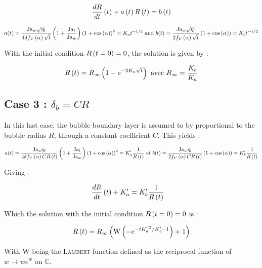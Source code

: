 \begin{align}
\frac{dR}{dt}\left( t \right)+a\left( t \right)R\left( t \right)=b\left( t \right)
\end{align}

\begin{align}
\label{eq:coeff_expgrowth}
a(t)=\frac{\mathrm{Ja}_{w}\sqrt{\eta_{l}}}{4\delta f_{V}\left( \alpha \right)\sqrt{t}}\left( 1+\frac{\mathrm{Ja}_{l}}{\mathrm{Ja}_{w}} \right)\left( 1+\mathrm{cos}\left( \alpha \right) \right)^{2}=K_{a}t^{-1/2} \text{ and } b(t)=\frac{\mathrm{Ja}_{w}\sqrt{\eta_{l}}}{2f_{V}\left( \alpha \right)\sqrt{t}}\left( 1+\mathrm{cos}\left( \alpha \right) \right)=K_ {b}t^{-1/2}
\end{align}

With the initial condition $R\left( t=0 \right)=0$, the solution is given by : 

\begin{align}
R\left( t \right)=R_{\infty}\left( 1-e^{-2K_{a}\sqrt{t}} \right) \text{ avec } R_{\infty}=\frac{K_{b}}{K_{a}}
\end{align}

\npar
\subsection{Case 3 : $\delta_{b}=CR$}
\npar

In this last case, the bubble boundary layer is assumed to by proportional to the bubble radius $R$, through a constant coefficient $C$. This yields :


\begin{align}
a(t)=\frac{\mathrm{Ja}_{w}\eta_{l}}{4\delta f_{V}\left( \alpha \right)CR\left( t \right)}\left( 1+\frac{\mathrm{Ja}_{l}}{\mathrm{Ja}_{w}} \right)\left( 1+\mathrm{cos}\left( \alpha \right) \right)^{2}=K'_{a}\frac{1}{R\left( t \right)} \text{ et } b(t)=\frac{\mathrm{Ja}_{w}\eta_{l}}{2f_{V}\left( \alpha \right)CR\left( t \right)}\left( 1+\mathrm{cos}\left( \alpha \right) \right)=K'_ {b}\frac{1}{R\left( t \right)}
\end{align}

Giving :

\begin{align}
&\frac{dR}{dt}\left( t \right) + K'_{a} = K'_{b}\frac{1}{R\left( t \right)}
\end{align}

Which the solution with the initial condition $R\left( t=0 \right)=0$ is :

\begin{align}
R\left( t \right)=R_{\infty}\left(  \text{W}\left( -e^{-t{K'_{a}}^{2}/K'_{b}-1}  \right) +1 \right)
\end{align}

With $\text{W}$ being the \textsc{Lambert} function defined as the reciprocal function of $w \rightarrow we^{w}$ on $\mathbb{C}$.



